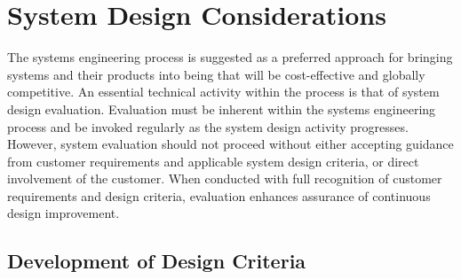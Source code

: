 \section{System Design Considerations}

The systems engineering process is suggested as a preferred approach for bringing systems and their products into being that will be cost-effective and globally competitive. An essential technical activity within the process is that of system design evaluation. Evaluation must be inherent within the systems engineering process and be invoked regularly as the system design activity progresses. However, system evaluation should not proceed without either accepting guidance from customer requirements and applicable system design criteria, or direct involvement of the customer. When conducted with full recognition of customer requirements and design criteria, evaluation enhances assurance of continuous design improvement.

\subsection{Development of Design Criteria}


